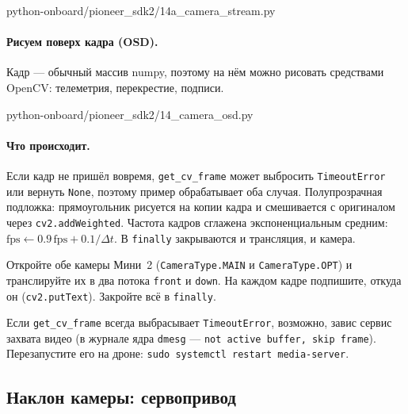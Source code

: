 \begin{codefile}[python]{python-onboard/pioneer_sdk2/14a_camera_stream.py}
\end{codefile}

\paragraph{Рисуем поверх кадра (OSD).} Кадр --- обычный массив numpy, поэтому на нём можно рисовать средствами OpenCV: телеметрия, перекрестие, подписи.

\begin{codefile}[python]{python-onboard/pioneer_sdk2/14_camera_osd.py}
\end{codefile}

\paragraph{Что происходит.} Если кадр не пришёл вовремя, \verb|get_cv_frame| может выбросить \verb|TimeoutError| или вернуть \verb|None|, поэтому пример обрабатывает оба случая. Полупрозрачная подложка: прямоугольник рисуется на копии кадра и смешивается с оригиналом через \verb|cv2.addWeighted|. Частота кадров сглажена экспоненциальным средним: $\text{fps} \leftarrow 0.9\,\text{fps} + 0.1/\Delta t$. В \verb|finally| закрываются и трансляция, и камера.

\begin{taskbox}
Откройте обе камеры Мини~2 (\verb|CameraType.MAIN| и \verb|CameraType.OPT|) и транслируйте их в два потока \texttt{front} и \texttt{down}. На каждом кадре подпишите, откуда он (\verb|cv2.putText|). Закройте всё в \verb|finally|.
\end{taskbox}

\begin{warnbox}
Если \verb|get_cv_frame| всегда выбрасывает \verb|TimeoutError|, возможно, завис сервис захвата видео (в журнале ядра \texttt{dmesg} --- \texttt{not active buffer, skip frame}). Перезапустите его на дроне: \verb|sudo systemctl restart media-server|.
\end{warnbox}

\subsection{Наклон камеры: сервопривод}

